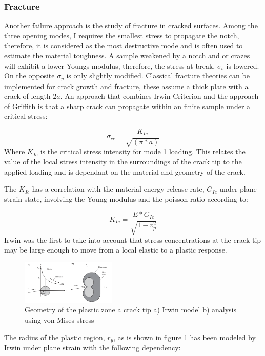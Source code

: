 \subsubsection{Fracture}
Another failure approach is the study of fracture in cracked surfaces. Among the three opening modes, I requires the smallest stress to propagate the notch, therefore, it is considered as the most destructive mode and is often used to estimate the material toughness. A sample weakened by a notch and or crazes will exhibit a lower Youngs modulus, therefore, the stress at break, $\sigma_b$ is lowered. On the opposite $\sigma_y$ is only slightly modified. Classical fracture theories can be implemented for crack growth and fracture, these assume a thick plate with a crack of length $2a$. An approach that combines Irwin Criterion and  the approach of Griffith is that a sharp crack can propagate within an finite sample under a critical stress:

\begin{equation} \label{eqn:criticalstress}
 \sigma_{cc}=\frac{K_{Ic}}{\sqrt{(\pi*a)}}
\end{equation}
Where $K_{Ic}$ is the critical stress intensity for mode 1 loading. This relates the value of the local stress intensity in the surroundings of the crack tip to the applied loading and is dependant on the material and geometry of the crack. 

The  $K_{Ic}$ has a correlation with the material energy release rate, $G_{Ic}$ under plane strain state, involving the Young modulus and the poisson ratio according to: 

\begin{equation} \label{eqn:crazecriterion}
K_{Ic}=\frac{E*G_{Ic}}{\sqrt{1-v^2_p}}
\end{equation}
Irwin was the first to take into account that stress concentrations at the crack tip may be large enough to move from a local elastic to a plastic response. 

\begin{figure}[htb]
    \centering
    \includegraphics[width=0.4\textwidth]{chapter_2/figures/Crackstress.png}
    \caption{Geometry of the plastic zone a crack tip a) Irwin model b) analysis using von Mises stress\cite{Halary2011PolymerMaterials}}
    \label{fig:stresscrack}
\end{figure}
The radius of the plastic region, $r_y$, as is shown in figure \ref{fig:stresscrack} has been modeled by Irwin under plane strain with the following dependency:

